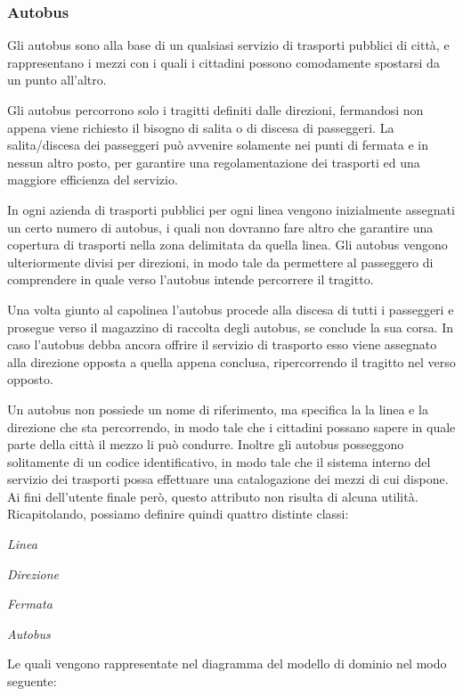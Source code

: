 \subsubsection{Autobus} %
\label{ssub:autobus}
Gli autobus sono alla base di un qualsiasi servizio di trasporti pubblici di città, e rappresentano i mezzi con i quali i cittadini possono comodamente spostarsi da un punto all'altro.

Gli autobus percorrono solo i tragitti definiti dalle direzioni, fermandosi non appena viene richiesto il bisogno di salita o di discesa di passeggeri. La salita/discesa dei passeggeri può avvenire solamente nei punti di fermata e in nessun altro posto, per garantire una regolamentazione dei trasporti ed una maggiore efficienza del servizio.

In ogni azienda di trasporti pubblici per ogni linea vengono inizialmente assegnati un certo numero di autobus, i quali non dovranno fare altro che garantire una copertura di trasporti nella zona delimitata da quella linea. Gli autobus vengono ulteriormente divisi per direzioni, in modo tale da permettere al passeggero di comprendere in quale verso l'autobus intende percorrere il tragitto.

Una volta giunto al capolinea l'autobus procede alla discesa di tutti i passeggeri e prosegue verso il magazzino di raccolta degli autobus, se conclude la sua corsa. In caso l'autobus debba ancora offrire il servizio di trasporto esso viene assegnato alla direzione opposta a quella appena conclusa, ripercorrendo il tragitto nel verso opposto.

Un autobus non possiede un nome di riferimento, ma specifica la la linea e la direzione che sta percorrendo, in modo tale che i cittadini possano sapere in quale parte della città il mezzo li può condurre.
Inoltre gli autobus posseggono solitamente di un codice identificativo, in modo tale che il sistema interno del servizio dei trasporti possa effettuare una catalogazione dei mezzi di cui dispone. Ai fini dell'utente finale però, questo attributo non risulta di alcuna utilità.\\

Ricapitolando, possiamo definire quindi quattro distinte classi:

{\itshape Linea}

{\itshape Direzione}

{\itshape Fermata}

{\itshape Autobus}

Le quali vengono rappresentate nel diagramma del modello di dominio nel modo seguente:

